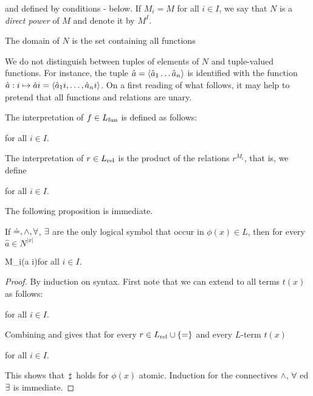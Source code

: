\smallskip

and defined by conditions - below.
If $M_i=M$ for all $i\in I$, we say that $N$ is a \emph{direct power\/} of $M$ and denote it by \emph{$M^I$.}

The domain of $N$ is the set containing all functions

\smallskip


We do not distinguish between tuples of elements of $N$ and tuple-valued functions.
For instance, the tuple $\hat a=\langle\hat a_1\dots\hat a_n\rangle$ is identified with the function $\hat a:i\mapsto\hat ai=\langle\hat a_1i,\dots,\hat a_ni\rangle$.
On a first reading of what follows, it may help to pretend that all functions and relations are unary.

The interpretation of $f\in L_{\rm fun}$ is defined as follows:

\hfill  for all $i\in I$.

The interpretation of $r\in L_{\rm rel}$ is the product of the relations $r^{M_i}$, that is, we define

\hfill  for all $i\in I$.


The following proposition is immediate.

\begin{proposition}\label{proposizioneprodottidiretti}
If $\doteq, \wedge, \forall$, $\exists$ are the only logical symbol that occur in $\phi(x)\in L$, then for every $\hat a\in N^{|x|}$

{\IFF}
{M_i\models\phi(\hat a i)}\hfill for all $i\in I$.

\end{proposition}

\begin{proof}
By induction on syntax.
First note that we can extend  to all terms $t(x)$ as follows:

\hfill  for all $i\in I$.

Combining  and  gives that for every $r\in L_{\rm rel}\cup\{=\}$ and every $L$-term $t(x)$

\hfill  for all $i\in I$.

This shows that $\,\sharp\,$ holds for $\phi(x)$ atomic.
Induction for the connectives $\wedge$, $\forall$ ed $\exists$ is immediate.
\end{proof}

